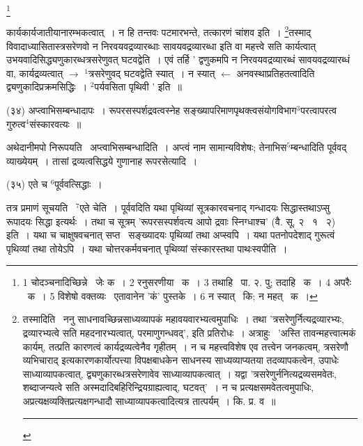 \documentclass[11pt, openany]{book}
\newcommand\blfootnote[1]{%
 \begingroup
 \renewcommand\thefootnote{}\footnote{#1}%
 \addtocounter{footnote}{-1}%
 \endgroup
}
\begin{document}
\blfootnote{1 चोदञ्चनादिच्छिन्ने  \textendash\ जेः क~। 2 रनुसरणीया  \textendash\ क~। 3 तथाहि  \textendash\ पा. २. पु; तदाहि  \textendash\ क~। 4 अपरैः  \textendash\ क~। 5 विशेषो वक्तव्यः  \textendash\ एतावानेन 'कं' पुस्तके~। 6 न स्यात्  \textendash\ कि; न महत्  \textendash\ क~।}

\newpage
\noindent
कार्यकार्यजातीयानारम्भकत्वात्~। न हि तन्तवः पटमारभन्ते, तत्कारणं चांशव इति~। \renewcommand{\thefootnote}{१}\footnote{तस्मादिति \textendash\ ननु साधनावच्छिन्नसाध्यव्यापकं महावयवारभ्यत्वमुपाधिः~। तथा 'त्रसरेणुर्नित्यद्रव्यारभ्यः, द्रव्यारभ्यत्वे सति महदनारभ्यत्वात्, परमाणुगन्धवद्', इति प्रतिरोधः~। अत्राहुः \textendash\ 'अस्ति तावन्महत्त्वात्मकं कार्यम्, तत्प्रति कारणत्वं कार्यद्रव्यत्वेनैव गृहीतम्~। न च महत्त्वविशेष एव तत्त्वेन जनकत्वम्, त्रसरेणौ व्यभिचाराद् इत्यकारणकार्योत्पत्त्या विपक्षबाधकेन साधनस्य साध्यव्याप्यतया तदव्यापकत्वेन, उपाधेः साध्याव्यापकत्वात्, द्व्यणुकारब्धत्रसरेणावेव साध्याव्यापकत्वात्~। यद्वा 'त्रसरेणुर्ननित्यद्रव्यसमवेतः, शब्दाजन्यत्वे सति अस्मदादिबहिरिन्द्रियग्राह्यत्वाद्, घटवत्'~। न च प्रत्यक्षसमवेतत्वमुपाधिः, अप्रत्यक्षव्यक्तिप्रत्यक्षगन्धादौ साध्याव्यापकत्वादित्यत्र तात्पर्यम्~। कि. प्र. व~॥\\ \rule{0.4\linewidth}{0.5pt}}तस्माद् विवादाध्यासितास्त्रसरेणवो न निरवयवद्रव्यारब्धाः सावयवद्रव्यारब्धा इति वा महत्त्वे सति कार्यत्वात् उभयवादिसिद्ध्यणुकारब्धत्रसरेणुवत् घटवद्वेति~। एवं तर्हि ' द्वणुकमपि न निरवयवद्रव्यारब्धं सावयवद्रव्यारब्धं वा, कार्यद्रव्यत्वात् $\rightarrow$ ${}^1$त्रसरेणुवद् घटवद्वेति स्यात्~। न स्यात् $\leftarrow$ अनवस्थाप्रतिहतत्वादिति द्व्यणुकादिप्रक्रमसिद्धिः~। ${}^2$पर्यवसिता पृथिवी ' इति~॥

\begin{sloppypar}
\hangindent=2cm {\knu (३४) अप्त्वाभिसम्बन्धादापः~। रूपरसस्पर्शद्रवत्वस्नेह सङ्ख्यापरिमाणपृथक्त्वसंयोगविभाग$^3$परत्वापरत्व गुरुत्व$^4$संस्कारवत्यः~॥}
\end{sloppypar}

अथेदानीमपो निरूपयति \textendash\ {\knu अप्त्वाभिसम्बन्धादिति~।} अप्त्वं नाम सामान्यविशेषः; तेनाभिस$^5$म्बन्धादिति पूर्ववद् व्याख्येयम्~। तासां द्रव्यत्वसिद्धये गुणानाह {\knu रूपरसेत्यादि~।}

\hangindent=2cm {\knu (३५) एते च ${}^6$पूर्ववत्सिद्धाः~।}

तत्र प्रमाणं सूचयति \textendash\ ${}^7$एते चेति~। पूर्ववदिति यथा पृथिव्यां सूत्रकारवचनाद् गन्धादयः सिद्धास्तथाऽप्सु रूपादयः सिद्धा इत्यर्थः~। तथा च सूत्रम् 'रूपरसस्पर्शवत्य आपो द्रवाः स्निग्धाश्च' (वै. सू. २ \textendash\ १ \textendash\ २) इति~। यथा च चाक्षुषवचनात् सप्त \textendash\ सङ्ख्यादयः पृथिव्यां तथा अप्स्वपि~। यथा पतनोपदेशाद् गुरूत्वं पृथिव्यां तथा तोयेऽपि~। यथा चोत्तरकर्मवचनात् पृथिव्यां संस्कारस्तथा पाथःस्वपीति~।
\end{document}
